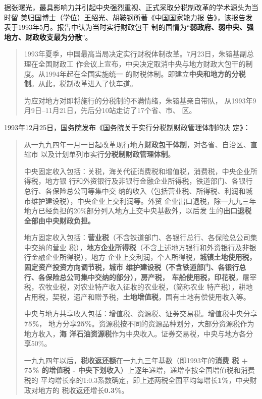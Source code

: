 据张曙光，最具影响力并引起中央强烈重视、正式采取分税制改革的学术源头为当时留
美归国博士（学位）王绍光、胡鞍钢所著《中国国家能力报
告》\cite[756]{fengyunshi1b}，该报告发表于1993年5月。报告中认为当时实行财政包干
制的国情为“\textbf{弱政府、弱中央、强地方、财政收支最为分散}”。

\begin{quotation}
  1993年夏季，中国最高当局决定实行财税体制改革。7月23日，朱镕基副总理在全国财政工
  作会议上宣布，中央决定取消中央与地方财政大包干的制度。从1994年起在全国实施统一
  的财税体制。即建立\textbf{中央和地方的分税制}。从此，税制改革进入了快车道。

  为应对地方对即将施行的分税制的不满情绪，朱镕基亲自带队，
  从1993年9月9日--11月21日，先后分10站走访了17个省、市、
  区。\cite[758]{fengyunshi1b}
\end{quotation}

1993年12月25日，国务院发布《国务院关于实行分税制财政管理体制的决
定》：

\begin{quotation}
  从一九九四年一月一日起改革现行地方\textbf{财政包干体制}，对各省、自治区、直辖市
  以及计划单列市实行\textbf{分税制财政管理体制}。

  中央固定收入包括：关税，海关代征消费税和增值税，消费税，中央企业所得税，地方银
  行和外资银行及非银行金融企业所得税，铁道部门、各银行总行、各保险总公司等集中交
  纳的收入（包括营业税、所得税、利润和城市维护建设税），中央企业上交利润等。外贸
  企业出口退税，除一九九三年地方已经负担的20\%部分列入地方上交中央基数外，以后发
  生的\textbf{出口退税全部由中央财政负担。}

  地方固定收入包括：\textbf{营业税}（不含铁道部门、各银行总行、各保险总公司集中交纳的营业
  税），\textbf{地方企业所得税}（不含上述地方银行和外资银行及非银行金融企业所得税），地方
  企业上交利润，个人所得税，\textbf{城镇土地使用税，固定资产投资方向调节税，城市
    维护建设税（不含铁道部门、各银行总行、各保险总公司集中交纳的部分），房产税，
    车船使用税，印花税}，屠宰税，农牧业税，对农业特产收入征收的农业税，（简称农业
  特产税），耕地占用税，契税，遗产和赠予税，\textbf{土地增值税}，国有土地有偿使用收入等。

  中央与地方共享收入包括：增值税、资源税、证券交易税。增值税中央分享\textbf{75\%}，
  地方分享\textbf{25\%}。资源税按不同的资源品种划分，大部分资源税作为地方收入，\textbf{海
    洋石油资源税}作为中央收入。证券交易税，中央与地方各分享50\%。

  一九九四年以后，\textbf{税收返还额}在一九九三年基数（即1993年的\textbf{消费
    税 + 75\% 的增值税 - 中央下划收入}）上逐年递增，递增率按全国增值税和消费税的
  平均增长率的1:0.3系数确定，即上述两税全国平均每增长\textbf{1\%}，中央财政对地方的
  税收返还增长\textbf{0.3\%}。
\end{quotation}

